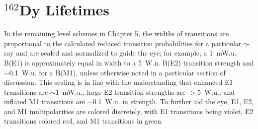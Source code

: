 

\section{$^{162}$Dy Lifetimes}



In the remaining level schemes in Chapter 5, the widths of transitions are proportional to the calculated reduced transition probabilities for a particular $\gamma$-ray and are scaled and normalized to guide the eye; for example, a 1~mW.u. B(E1) is approximately equal in width to a 5~W.u. B(E2) transition strength and $\sim$0.1~W.u. for a B(M1), unless otherwise noted in a particular section of discussion. This scaling is in line with the understanding that enhanced E1 transitions are $\sim$1~mW.u., large E2 transition strengths are $>$5~W.u., and inflated M1 transitions are $\sim$0.1~W.u. in strength. To further aid the eye, E1, E2, and M1 multipolarities are colored discretely, with E1 transitions being violet, E2 transitions colored red, and M1 transitions in green. 



